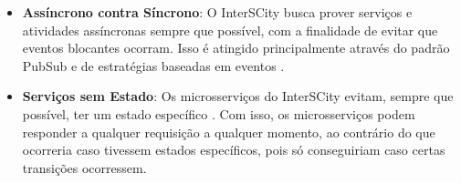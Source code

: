 \begin{apendicesenv}
\begin{itemize}
        \item \textbf{Assíncrono contra Síncrono}: O InterSCity busca prover
            serviços e atividades assíncronas sempre que possível, com a finalidade de
            evitar que eventos blocantes ocorram. Isso é atingido principalmente através
            do padrão PubSub e de estratégias baseadas em eventos \cite{delesposte2017}.

        \item \textbf{Serviços sem Estado}: Os microsserviços do InterSCity evitam,
            sempre que possível, ter um estado específico \cite{delesposte2017}. Com isso,
            os microsserviços podem responder a qualquer requisição a qualquer momento, ao
            contrário do que ocorreria caso tivessem estados específicos, pois só
            conseguiriam caso certas transições ocorressem.
    \end{itemize}
\end{apendicesenv}

